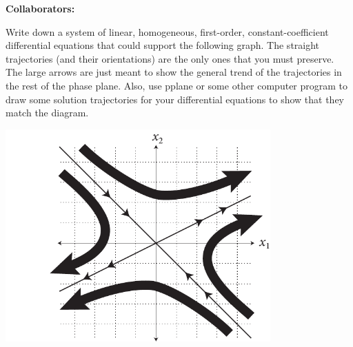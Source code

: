 \documentclass[11pt,letterpaper,boxed]{hmcpset}
\begin{document}
\noindent\textbf{Collaborators:} 

\begin{problem}[1.]  Write down a system of linear, homogeneous, first-order,
  constant-coefficient differential equations that could support the
  following graph.  The straight trajectories (and their orientations)
  are the only ones that you must preserve.  The large arrows are just
  meant to show the general trend of the trajectories in the rest of
  the phase plane.  Also, use pplane or some other
  computer program to draw some solution trajectories for your
  differential equations to show that they match the diagram.


\centering\includegraphics[width=4in,keepaspectratio=true]{./hw8phaseplane}

\end{problem}
%

\begin{solution}
\vfill
\end{solution}
\newpage
\end{document}
